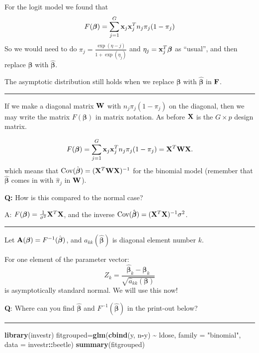 \documentclass[
]{article}
\newenvironment{Shaded}{\begin{snugshade}}{\end{snugshade}}
\newcommand{\AttributeTok}[1]{\textcolor[rgb]{0.13,0.29,0.53}{#1}}
\newcommand{\FunctionTok}[1]{\textcolor[rgb]{0.13,0.29,0.53}{\textbf{#1}}}
\newcommand{\NormalTok}[1]{#1}
\newcommand{\OtherTok}[1]{\textcolor[rgb]{0.56,0.35,0.01}{#1}}
\newcommand{\SpecialCharTok}[1]{\textcolor[rgb]{0.81,0.36,0.00}{\textbf{#1}}}
\newcommand{\StringTok}[1]{\textcolor[rgb]{0.31,0.60,0.02}{#1}}
\begin{document}
For the logit model we found that
\[F(\boldsymbol{\beta})=\sum_{j=1}^G {\bf x}_j {\bf x}_j^T n_j \pi_j (1-\pi_j)\]
So we would need to do \(\pi_j=\frac{\exp(\eta-j)}{1+\exp(\eta_j)}\) and
\(\eta_j={\bf x}_j^T\boldsymbol{\beta}\) as ``usual'', and then replace
\(\boldsymbol{\beta}\) with \(\hat{\boldsymbol{\beta}}\).

The asymptotic distribution still holds when we replace
\(\boldsymbol{\beta}\) with \(\hat{\boldsymbol{\beta}}\) in \({\bf F}\).

\begin{center}\rule{0.5\linewidth}{0.5pt}\end{center}

If we make a diagonal matrix \({\bf W}\) with \(n_j \pi_j (1-\pi_j)\) on
the diagonal, then we may write the matrix \(F(\boldsymbol{\beta})\) in
matrix notation. As before \({\bf X}\) is the \(G\times p\) design
matrix.

\[F(\boldsymbol{\beta})=\sum_{j=1}^G {\bf x}_j {\bf x}_j^T n_j \pi_j (1-\pi_j)={\bf X}^T {\bf W} {\bf X}.\]
which means that
\(\text{Cov}(\hat{\boldsymbol{\beta}})=({\bf X}^T {\bf W} {\bf X})^{-1}\)
for the binomial model (remember that \(\hat{\boldsymbol{\beta}}\) comes
in with \(\hat{\pi}_j\) in \({\bf W}\)).

\textbf{Q:} How is this compared to the normal case?

A: \(F(\boldsymbol{\beta})=\frac{1}{\sigma^2}{\bf X}^T{\bf X}\), and the
inverse
\(\text{Cov}(\hat{\boldsymbol{\beta}})=({\bf X}^T {\bf X})^{-1}\sigma^2\).

\begin{center}\rule{0.5\linewidth}{0.5pt}\end{center}

Let \({\bf A}(\boldsymbol{\beta})=F^{-1}(\hat{\boldsymbol{\beta}})\),
and \(a_{kk}(\hat{\boldsymbol{\beta}})\) is diagonal element number
\(k\).

For one element of the parameter vector:
\[ Z_k=\frac{\hat{\boldsymbol{\beta}}_k-\boldsymbol{\beta}_k}{\sqrt{\hat{a}_{kk}({\boldsymbol{\beta}})}}\]
is asymptotically standard normal. We will use this now!

\textbf{Q}: Where can you find \(\hat{\boldsymbol{\beta}}\) and
\(F^{-1}(\hat{\boldsymbol{\beta}})\) in the print-out below?

\begin{center}\rule{0.5\linewidth}{0.5pt}\end{center}

\begin{Shaded}
\begin{Highlighting}[]
\FunctionTok{library}\NormalTok{(investr)}
\NormalTok{fitgrouped}\OtherTok{=}\FunctionTok{glm}\NormalTok{(}\FunctionTok{cbind}\NormalTok{(y, n}\SpecialCharTok{{-}}\NormalTok{y) }\SpecialCharTok{\textasciitilde{}}\NormalTok{ ldose, }\AttributeTok{family =} \StringTok{"binomial"}\NormalTok{, }\AttributeTok{data =}\NormalTok{ investr}\SpecialCharTok{::}\NormalTok{beetle) }
\FunctionTok{summary}\NormalTok{(fitgrouped)}
\end{Highlighting}
\end{Shaded}
\end{document}
